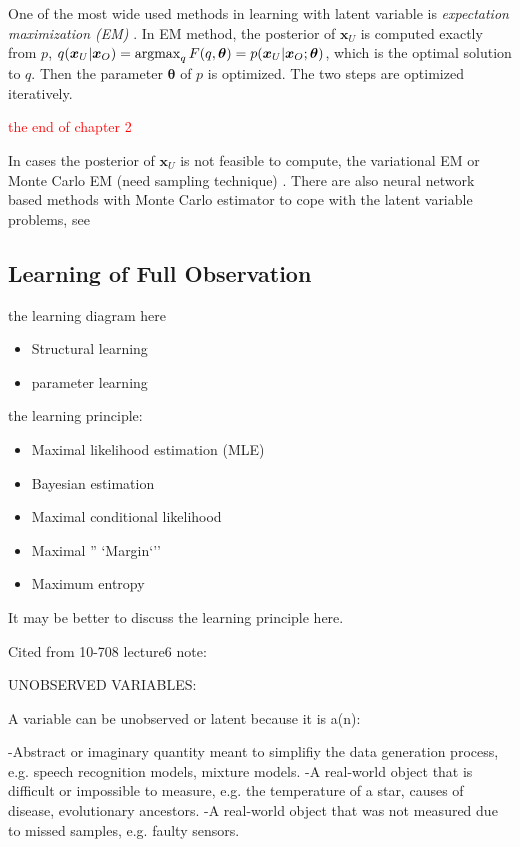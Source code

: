 One of the most wide used methods in learning with latent variable is \textit{expectation maximization (EM)} \cite{DEMP1977em}. In EM method, the posterior of $\bm{x}_U$ is computed exactly from $p$, $q(\bm{x}_U|\bm{x}_O) = \operatorname{argmax}_{q}{F(q, \bm{\theta})} = p(\bm{x}_U|\bm{x}_O; \bm{\theta})$, which is the optimal solution to $q$. Then the parameter $\bm{\theta}$ of $p$ is optimized. The two steps are optimized iteratively.

\textcolor{red}{the end of chapter 2}

In cases the posterior of $\bm{x}_U$ is not feasible to compute, the variational EM\cite[section~6.2.2]{wainwright2008graphical} or Monte Carlo EM (need sampling technique) \cite{neath2012convergence}. There are also neural network based methods with Monte Carlo estimator to cope with the latent variable problems, see \cite{DBLP:journals/corr/KingmaW13}\cite{kuleshov2017NVIL, lazarogredilla2019learning, goodfellow2014gan}


\subsection{Learning of Full Observation}

the learning diagram here
\begin{itemize}
\item Structural learning
\item parameter learning
\end{itemize}


the learning principle:
\begin{itemize}
\item Maximal likelihood estimation (MLE)
\item Bayesian estimation
\item Maximal conditional likelihood
\item Maximal '' `Margin`''
\item Maximum entropy
\end{itemize}


It may be better to discuss the learning principle here.

Cited from 10-708 lecture6 note:

UNOBSERVED VARIABLES:

A variable can be unobserved or latent because it is a(n):

-Abstract or imaginary quantity meant to simplifiy the data generation process, e.g. speech recognition models, mixture models.
-A real-world object that is difficult or impossible to measure, e.g. the temperature of a star, causes of disease, evolutionary ancestors.
-A real-world object that was not measured due to missed samples, e.g. faulty sensors.

